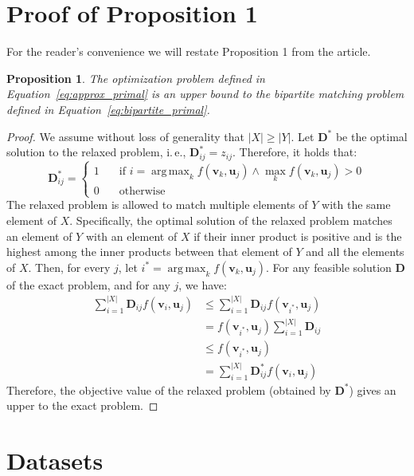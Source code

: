 \documentclass[twoside]{article}
\DeclareMathOperator*{\argmax}{arg\,max}
\newcommand{\ie}{i.\,e., }
\newtheorem{proposition}{Proposition}
\begin{document}
\section{Proof of Proposition 1}\label{sec:proof_proposition}
For the reader's convenience we will restate Proposition 1 from the article.
\begin{proposition}
    The optimization problem defined in Equation~\ref{eq:approx_primal} is an upper bound to the bipartite matching problem defined in Equation~\ref{eq:bipartite_primal}.
\end{proposition}
\begin{proof}
We assume without loss of generality that $|X| \geq |Y|$.
Let $\mathbf{D}^*$ be the optimal solution to the relaxed problem, \ie $\mathbf{D}_{ij}^* = z_{ij}$.
Therefore, it holds that:
\[ \mathbf{D}_{ij}^*=
  \begin{cases}
    1  & \quad \text{if } i=\argmax_k f(\textbf{v}_k,\textbf{u}_j) \wedge \max_k f(\textbf{v}_k,\textbf{u}_j) > 0\\
    0  & \quad \text{otherwise}
  \end{cases}
\]
The relaxed problem is allowed to match multiple elements of $Y$ with the same element of $X$.
Specifically, the optimal solution of the relaxed problem matches an element of $Y$ with an element of $X$ if their inner product is positive and is the highest among the inner products between that element of $Y$ and all the elements of $X$.
Then, for every $j$, let $i^*=\argmax_k f(\textbf{v}_k,\textbf{u}_j)$.
For any feasible solution $\mathbf{D}$ of the exact problem, and for any $j$, we have:
\begin{equation}
    \begin{split}
        \sum_{i=1}^{|X|} \mathbf{D}_{ij} f(\mathbf{v}_i, \mathbf{u}_j) &\leq \sum_{i=1}^{|X|} \mathbf{D}_{ij} f(\mathbf{v}_{i^*}, \mathbf{u}_j) \\
        &= f(\mathbf{v}_{i^*}, \mathbf{u}_j)\sum_{i=1}^{|X|} \mathbf{D}_{ij} \\ 
        &\leq f(\mathbf{v}_{i^*}, \mathbf{u}_j) \\
        &= \sum_{i=1}^{|X|} \mathbf{D}^*_{ij} f(\mathbf{v}_i, \mathbf{u}_j)
    \end{split}
\end{equation}
Therefore, the objective value of the relaxed problem (obtained by $\mathbf{D}^*$) gives an upper to the exact problem.
\end{proof}

\section{Datasets}\label{sec:datasets}
\end{document}
